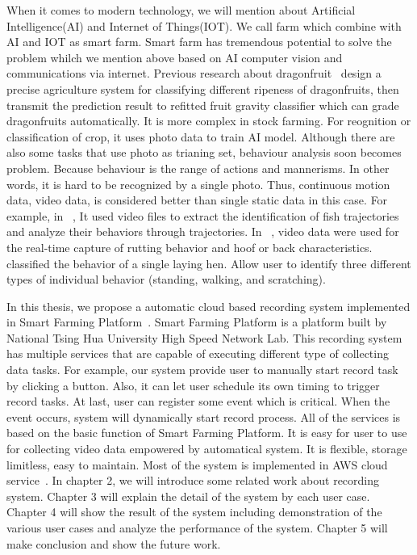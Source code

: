 When it comes to modern technology, we will mention about Artificial Intelligence(AI) and Internet of Things(IOT). We call farm which combine with AI and IOT as smart farm. Smart farm has tremendous potential to solve the problem whilch we mention above based on AI computer vision and communications via internet. Previous research about dragonfruit~\cite{agri-ai} design a precise agriculture system for classifying different ripeness of dragonfruits, then transmit the prediction result to refitted fruit gravity classifier which can grade dragonfruits automatically. It is more complex in stock farming. For reognition or classification of crop, it uses photo data to train AI model. Although there are also some tasks that use photo as trianing set, behaviour analysis soon becomes problem. Because behaviour is the range of actions and mannerisms. In other words, it is hard to be recognized by a single photo. Thus, continuous motion data, video data, is considered better than single static data in this case. For example, in ~\cite{fish-paper}, It used video files to extract the identification of fish trajectories and analyze their behaviors through trajectories. In ~\cite{cow-paper}, video data were used for the real-time capture of rutting behavior and hoof or back characteristics. ~\cite{hens-paper} classified the behavior of a single laying hen. Allow user to identify three different types of individual behavior (standing, walking, and scratching).

In this thesis, we propose a automatic cloud based recording system implemented in Smart Farming Platform~\cite{agri-web}. Smart Farming Platform is a platform built by National Tsing Hua University High Speed Network Lab. This recording system has multiple services that are capable of executing different type of collecting data tasks. For example, our system provide user to manually start record task by clicking a button. Also, it can let user schedule its own timing to trigger record tasks. At last, user can register some event which is critical. When the event occurs, system will dynamically  start record process. All of the services is based on the basic function of Smart Farming Platform. It is easy for user to use for collecting video data empowered by automatical system. It is flexible, storage limitless, easy to maintain. Most of the system is implemented in AWS cloud service~\cite{aws}. In chapter 2, we will introduce some related work about recording system. Chapter 3 will explain the detail of the system by each user case. Chapter 4 will show the result of the system including demonstration of the various user cases and analyze the performance of the system. Chapter 5 will make conclusion and show the future work.

